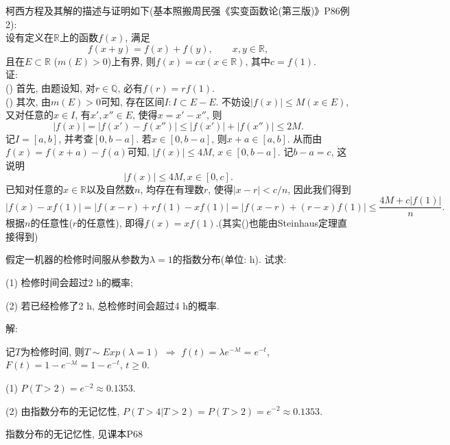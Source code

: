 \documentclass[standard]{ExBook}
\begin{document}
\begin{qitems}
\begin{bbox}
\textcolor{themeColor}{\selectfont {} 柯西方程及其解的描述与证明如下(基本照搬周民强《实变函数论(第三版)》P86例2):\\
设有定义在$\mathbb{R}$上的函数$f(x)$, 满足
$$f(x+y)=f(x)+f(y),\qquad x,y\in\mathbb{R},$$
且在$E\subset\mathbb{R}$ ($m(E)>0$)上有界, 则$f(x)=cx(x\in\mathbb{R})$, 其中$c=f(1)$.\\
证:\\
() 首先, 由题设知, 对$r\in\mathbb{Q}$, 必有$f(r)=rf(1)$.\\
() 其次, 由$m(E)>0$可知, 存在区间$I:I\subset E-E$. 不妨设$|f(x)|\leq M(x\in E)$, 又对任意的$x\in I$, 有$x',x''\in E$, 使得$x=x'-x''$, 则
$$|f(x)|=|f(x')-f(x'')|\leq |f(x')|+|f(x'')|\leq 2M.$$
记$I=[a,b]$, 并考查$[0,b-a]$. 若$x \in [0,b-a]$, 则$x+a\in[a,b]$. 从而由$f(x)=f(x+a)-f(a)$可知, $|f(x)|\leq 4M$, $x\in[0,b-a]$. 记$b-a=c$, 这说明
$$|f(x)|\leq 4M,x\in[0,c].$$
已知对任意的$x\in\mathbb{R}$以及自然数$n$, 均存在有理数$r$, 使得$|x-r|<c/n$, 因此我们得到
$$|f(x)-xf(1)|=|f(x-r)+rf(1)-xf(1)|=|f(x-r)+(r-x)f(1)|\leq \frac{4M+c|f(1)|}{n}.$$
根据$n$的任意性($r$的任意性), 即得$f(x)=xf(1)$.\qquad(其实()也能由Steinhaus定理直接得到)} 
    \end{bbox}

\vspace{-5em}

    \begin{bbox}
    \begin{shaded}
        \qitem
假定一机器的检修时间服从参数为$\lambda=1$的指数分布(单位: h). 试求: 

(1) 检修时间会超过2 h的概率;

(2) 若已经检修了2 h, 总检修时间会超过4 h的概率.
    \end{shaded}
    \end{bbox}

\vspace{-5em}

    \begin{bbox}
解: 

记$T$为检修时间, 则$T\sim Exp(\lambda=1)$ $\Longrightarrow$ $f(t)=\lambda e^{-\lambda t}=e^{-t}$, $F(t)=1-e^{-\lambda t}=1-e^{-t}$, $t\geq 0$. 

(1) $P(T>2)=e^{-2}\approx0.1353$.

(2) 由指数分布的无记忆性, $P(T>4|T>2)=P(T>2)=e^{-2}\approx0.1353$.

\textcolor{themeColor}{\selectfont {} 指数分布的无记忆性, 见课本P68}
    \end{bbox}


\end{qitems}
\end{document}
